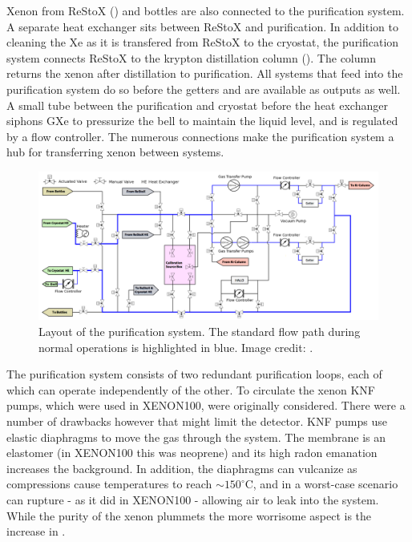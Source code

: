 Xenon from ReStoX  () and bottles are also connected to the purification system.  A separate heat exchanger
sits between ReStoX and purification.  In
addition to cleaning the Xe as it is transfered from ReStoX to the cryostat, the purification system connects ReStoX to the krypton
distillation column ().  The column returns the xenon after distillation to purification.  All systems that
feed into the purification system do so before the getters and are available as outputs as well.  A small tube between the purification
and cryostat before the heat exchanger siphons GXe to pressurize the bell to maintain the liquid level, and is regulated by a flow
controller.  The numerous connections make the purification system a hub for transferring xenon between systems.

\begin{figure}
\centering
\includegraphics[width=\textwidth]{PurificationLayout}
\caption{Layout of the purification system.  The standard flow path during normal operations is highlighted in blue.  Image credit:
.}
\label{fig:xenon1t_pur_schematic}
\end{figure}

The purification system consists of two redundant purification loops, each of which can operate independently of the other.  To circulate
the xenon KNF pumps, which were used in XENON100, were originally considered.  There were a number of drawbacks however that might limit
the detector.  KNF pumps use elastic diaphragms to move the gas through the system.  The membrane is an elastomer (in XENON100 this was
neoprene) and its high radon emanation increases the background.  In addition, the diaphragms can vulcanize as compressions cause
temperatures to reach ${\sim} 150^{\circ}\mathrm{C}$, and in a worst-case scenario can rupture - as it did in XENON100 - allowing air to
leak into the system.  While the purity of the xenon plummets the more worrisome aspect is the increase in .

